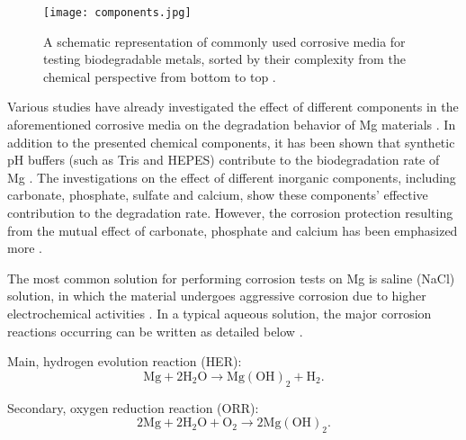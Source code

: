 \begin{figure}
\centering
\medskip
\texttt{[image: components.jpg]}
\caption[Commonly used corrosive media for testing biodegradable metals]{A schematic representation of commonly used corrosive media for testing biodegradable metals, sorted by their complexity from the chemical perspective from bottom to top \cite{Mei2020}.}
\label{fig:components}
\end{figure}

Various studies have already investigated the effect of different components in the aforementioned corrosive media on the degradation behavior of Mg materials \cite{Mei2019,Zeng2014,Johnston2017, Lamaka2018,Mei2019a}. In addition to the presented chemical components, it has been shown that synthetic pH buffers (such as Tris and HEPES) contribute to the biodegradation rate of Mg \cite{Mei2019}. The investigations on the effect of different inorganic components, including carbonate, phosphate, sulfate and calcium, show these components' effective contribution to the degradation rate. However, the corrosion protection resulting from the mutual effect of carbonate, phosphate and calcium has been emphasized more \cite{Mei2019,Lamaka2018}.




The most common solution for performing corrosion tests on Mg is saline (NaCl) solution, in which the material undergoes aggressive corrosion due to higher electrochemical activities \cite{Hadzima2014,Lu2019}. In a typical aqueous solution, the major corrosion reactions occurring can be written as detailed below \cite{Li2020,Atrens2015}.


Main, hydrogen evolution reaction (\gls{HER}):
\begin{equation}
\mathrm{Mg}+2 \mathrm{H}_{2} \mathrm{O} \rightarrow \mathrm{Mg}(\mathrm{OH})_{2}+\mathrm{H}_{2}.
\end{equation}

Secondary, oxygen reduction reaction (\gls{ORR}):
\begin{equation}
2 \mathrm{Mg}+2 \mathrm{H}_{2} \mathrm{O}+\mathrm{O}_{2} \rightarrow 2 \mathrm{Mg}(\mathrm{OH})_{2}.
\end{equation}

